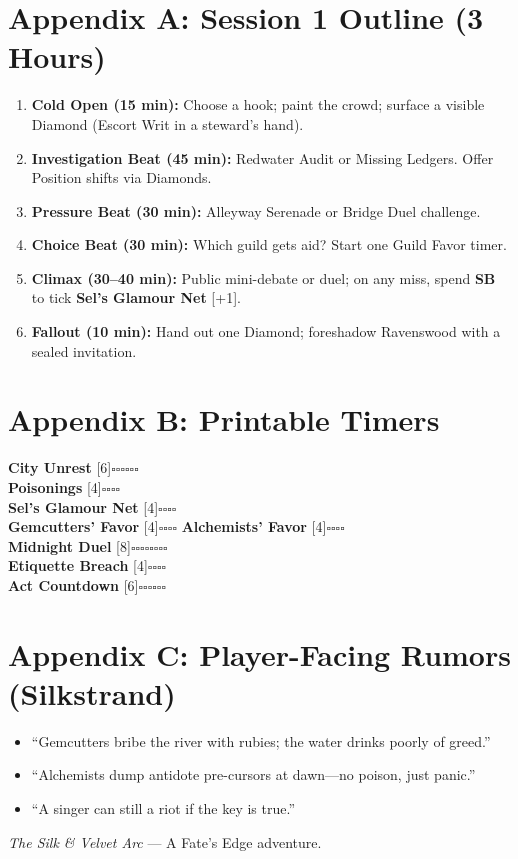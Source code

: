 \documentclass[11pt]{article}
\newcommand{\Clock}[2]{\textbf{#1} [#2]}
\newcommand{\Term}[1]{\textbf{#1}}
\newcommand{\SB}{\Term{SB}}
\begin{document}
\section*{Appendix A: Session 1 Outline (3 Hours)}

\begin{enumerate}
\item \textbf{Cold Open (15 min):} Choose a hook; paint the crowd; surface a visible Diamond (Escort Writ in a steward's hand).
\item \textbf{Investigation Beat (45 min):} Redwater Audit or Missing Ledgers. Offer Position shifts via Diamonds.
\item \textbf{Pressure Beat (30 min):} Alleyway Serenade or Bridge Duel challenge.
\item \textbf{Choice Beat (30 min):} Which guild gets aid? Start one Guild Favor timer.
\item \textbf{Climax (30--40 min):} Public mini-debate or duel; on any miss, spend \SB{} to tick \Clock{Sel's Glamour Net}{+1}.
\item \textbf{Fallout (10 min):} Hand out one Diamond; foreshadow Ravenswood with a sealed invitation.
\end{enumerate}

\section*{Appendix B: Printable Timers}
\begin{tcolorbox}[breakable]
\Clock{City Unrest}{6}\hfill\(\square\square\square\square\square\square\)\\[3pt]
\Clock{Poisonings}{4}\hfill\(\square\square\square\square\)\\[3pt]
\Clock{Sel's Glamour Net}{4}\hfill\(\square\square\square\square\)\\[3pt]
\Clock{Gemcutters' Favor}{4}\hfill\(\square\square\square\square\)\quad
\Clock{Alchemists' Favor}{4}\hfill\(\square\square\square\square\)\\[3pt]
\Clock{Midnight Duel}{8}\hfill\(\square\square\square\square\square\square\square\square\)\\[3pt]
\Clock{Etiquette Breach}{4}\hfill\(\square\square\square\square\)\\[3pt]
\Clock{Act Countdown}{6}\hfill\(\square\square\square\square\square\square\)
\end{tcolorbox}

\section*{Appendix C: Player-Facing Rumors (Silkstrand)}
\begin{itemize}
\item ``Gemcutters bribe the river with rubies; the water drinks poorly of greed.''
\item ``Alchemists dump antidote pre-cursors at dawn---no poison, just panic.''
\item ``A singer can still a riot if the key is true.''
\end{itemize}

\vfill
\begin{center}
\small{\emph{The Silk \& Velvet Arc} --- A Fate's Edge adventure.}
\end{center}


\end{document}
